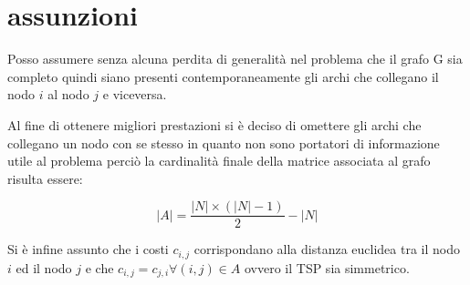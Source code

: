 %
%
\section[Assunzioni]{assunzioni}
\label{pt1:assumption}
Posso assumere senza alcuna perdita di generalità nel problema che il grafo G sia completo quindi siano presenti contemporaneamente gli archi che collegano il nodo $i$ al nodo $j$ e viceversa.

Al fine di ottenere migliori prestazioni si è deciso di omettere gli archi che collegano un nodo con se stesso in quanto non sono portatori di informazione utile al problema perciò la cardinalità finale della matrice associata al grafo risulta essere:

\begin{equation}
\left|A\right| = \frac{\left|N\right|\times\left(\left|N\right|-1\right)}{2} - \left|N\right|
\end{equation}

Si è infine assunto che i costi $c_{i,j}$ corrispondano alla distanza euclidea tra il nodo $i$ ed il nodo $j$ e che $c_{i,j}=c_{j,i} \forall (i,j)\in A$ ovvero il TSP sia simmetrico.
